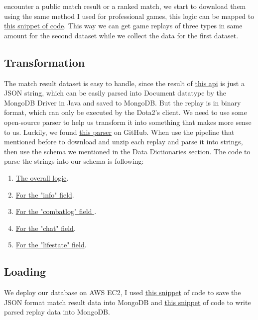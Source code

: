 \documentclass{article}
\begin{document}
encounter a public match result or a ranked match, we start to download them using the same method I used for professional games, this logic can be mapped to \href{https://github.com/Vopaaz/big-data-psg-lgd/blob/a9a285e0e29c0d9e56b41994875df830c7e7b51b/src/main/java/FetchStore/ValveAPI.java#L104-L129}{this snippet of code}. This way we can get game replays of three types in same amount for the second dataset while we collect the data for the first dataset.
\subsection{Transformation}
    The match result dataset is easy to handle, since the result of  \href{https://wiki.teamfortress.com/wiki/WebAPI/GetMatchHistoryBySequenceNum}{this api} is just a JSON string, which can be easily parsed into Document datatype by the MongoDB Driver in Java and saved to MongoDB. But the replay is in binary format, which can only be executed by the Dota2's client. We need to use some open-source parser to help us transform it into something that makes more sense to us. Luckily, we found \href{https://github.com/skadistats/clarity}{this parser} on GitHub. When use the pipeline that mentioned before to download and unzip each replay and parse it into strings, then use the schema we mentioned in the Data Dictionaries section. The code to parse the strings into our schema is following:
\begin{enumerate}
\item \href{https://github.com/Vopaaz/big-data-psg-lgd/blob/master/src/main/java/ParseReplay/ParseReplayExecutor.java}{The overall logic}.
\item \href{https://github.com/Vopaaz/big-data-psg-lgd/blob/master/src/main/java/ParseReplay/Info.java}{For the "info" field}.
\item \href{https://github.com/Vopaaz/big-data-psg-lgd/blob/master/src/main/java/ParseReplay/Combatlog.java}{For the "combatlog" field }.
\item \href{https://github.com/Vopaaz/big-data-psg-lgd/blob/master/src/main/java/ParseReplay/Chat.java}{For the "chat" field}.
\item \href{https://github.com/Vopaaz/big-data-psg-lgd/blob/master/src/main/java/ParseReplay/Lifestate.java}{For the "lifestate" field}.
\end{enumerate}

\subsection{Loading}
We deploy our database on AWS EC2, I used \href{https://github.com/Vopaaz/big-data-psg-lgd/blob/a9a285e0e29c0d9e56b41994875df830c7e7b51b/src/main/java/FetchStore/ValveAPI.java#L164-L178}{this snippet} of code to save the JSON format match result data into MongoDB and \href{https://github.com/Vopaaz/big-data-psg-lgd/blob/a9a285e0e29c0d9e56b41994875df830c7e7b51b/src/main/java/FetchStore/ValveAPI.java#L406-L420}{this snippet} of code to write parsed replay data into MongoDB.
\end{document}

